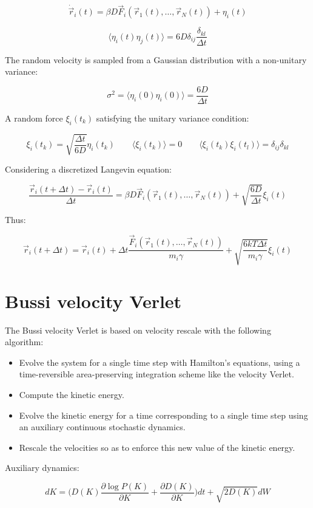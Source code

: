 	$$\dot{\vec{r}}_i(t) = \beta D\vec{F}_i(\vec{r}_1(t), \dots, \vec{r}_N(t)) + \eta_i(t)$$

	$$\langle\eta_i(t)\eta_j(t)\rangle = 6D\delta_{ij}\frac{\delta_{kl}}{\Delta t}$$

	The random velocity is sampled from a Gaussian distribution with a non-unitary variance:

	$$\sigma^2 = \langle\eta_i(0)\eta_i(0)\rangle = \frac{6D}{\Delta t}$$

	A random force $\xi_i(t_k)$ satisfying the unitary variance condition:

	$$\xi_i(t_k) = \sqrt{\frac{\Delta t}{6D}}\eta_i(t_k)\qquad\langle\xi_i(t_k)\rangle = 0\qquad\langle\xi_i(t_k)\xi_i(t_l)\rangle = \delta_{ij}\delta_{kl}$$

	Considering a discretized Langevin equation:

	$$\frac{\vec{r}_i(t+ \Delta t) - \vec{r}_i(t)}{\Delta t} = \beta D\vec{F}_i(\vec{r}_1(t), \dots, \vec{r}_N(t)) + \sqrt{\frac{6D}{\Delta t}}\xi_i(t)$$

	Thus:

	$$\vec{r}_i(t + \Delta t) = \vec{r}_i(t) + \Delta t\frac{\vec{F}_i(\vec{r}_1(t), \dots, \vec{r}_N(t))}{m_i\gamma} + \sqrt{\frac{6kT\Delta t}{m_i\gamma}}\xi_i(t)$$

\section{Bussi velocity Verlet}
The Bussi velocity Verlet is based on velocity rescale with the following algorithm:

\begin{multicols}{2}
	\begin{itemize}
		\item Evolve the system for a single time step with Hamilton's equations, using a time-reversible area-preserving integration scheme like the velocity Verlet.
		\item Compute the kinetic energy.
		\item Evolve the kinetic energy for a time corresponding to a single time step using an auxiliary continuous stochastic dynamics.
		\item Rescale the velocities so as to enforce this new value of the kinetic energy.
	\end{itemize}
\end{multicols}

Auxiliary dynamics:

$$dK = \biggl(D(K)\frac{\partial\log P(K)}{\partial K}+\frac{\partial D(K)}{\partial K}\biggr)dt + \sqrt{2D(K)}dW$$

